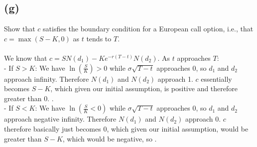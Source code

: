 \documentclass{article}
\begin{document}
{\subsection*{(g)}
Show that \(c\) satisfies the boundary condition for a European call option, i.e., that \(c = \max(S - K, 0)\) as \(t\) tends to \(T\). \\ \\
We know that \( c = SN(d_1) - Ke^{-r(T-t)} N(d_2) \). As \(t\) approaches \(T\): \\
- If \(S > K\): We have \(\ln(\frac{S}{K}) > 0\) while \(\sigma \sqrt{T - t}\) approaches 0, so \(d_1\) and \(d_2\) approach infinity. Therefore \(N(d_1)\) and \(N(d_2)\) approach 1. \(c\) essentially becomes \(S - K\), which given our initial assumption, is positive and therefore greater than 0. . \\
- If \(S < K\): We have \(\ln(\frac{S}{K} < 0)\) while \(\sigma \sqrt{T - t}\) approaches 0, so \(d_1\) and \(d_2\) approach negative infinity. Therefore \(N(d_1)\) and \(N(d_2)\) approach 0. \(c\) therefore basically just becomes 0, which given our initial assumption, would be greater than \(S - K\), which would be negative, so .

}
\end{document}
